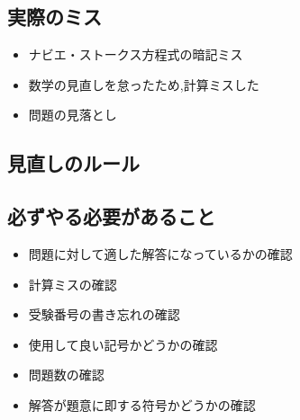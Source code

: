 \documentclass[a4paper]{jsarticle}
\begin{document}
\subsection{実際のミス}
\begin{itemize}
    \item ナビエ・ストークス方程式の暗記ミス
    \item 数学の見直しを怠ったため,計算ミスした
    \item 問題の見落とし
\end{itemize}
\subsection{見直しのルール}
\subsection{必ずやる必要があること}
\begin{itemize}
    \item 問題に対して適した解答になっているかの確認
    \item 計算ミスの確認
    \item 受験番号の書き忘れの確認
    \item 使用して良い記号かどうかの確認
    \item 問題数の確認
    \item 解答が題意に即する符号かどうかの確認
\end{itemize}
\end{document}
